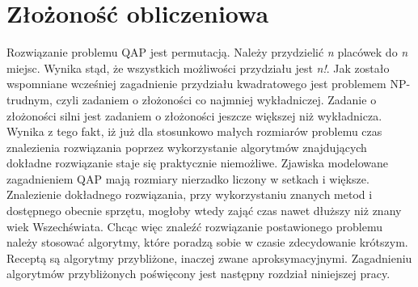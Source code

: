 \section{Złożoność obliczeniowa}
Rozwiązanie problemu QAP jest permutacją. Należy przydzielić \textit{n} placówek do \textit{n} miejsc. Wynika stąd, że wszystkich możliwości przydziału jest \textit{n!}. Jak zostało wspomniane wcześniej zagadnienie przydziału kwadratowego jest problemem NP-trudnym, czyli zadaniem o złożoności co najmniej wykładniczej. Zadanie o złożoności silni jest zadaniem o złożoności jeszcze większej niż wykładnicza. Wynika z tego fakt, iż już dla stosunkowo małych rozmiarów problemu czas znalezienia rozwiązania poprzez wykorzystanie algorytmów znajdujących dokładne rozwiązanie staje się praktycznie niemożliwe. Zjawiska modelowane zagadnieniem QAP mają rozmiary nierzadko liczony w setkach i większe. Znalezienie dokładnego rozwiązania, przy wykorzystaniu znanych metod i dostępnego obecnie sprzętu, mogłoby wtedy zająć czas nawet dłuższy niż znany wiek Wszechświata. Chcąc więc znaleźć rozwiązanie postawionego problemu należy stosować algorytmy, które poradzą sobie w czasie zdecydowanie krótszym. Receptą są algorytmy przybliżone, inaczej zwane aproksymacyjnymi. Zagadnieniu algorytmów przybliżonych poświęcony jest następny rozdział niniejszej pracy.